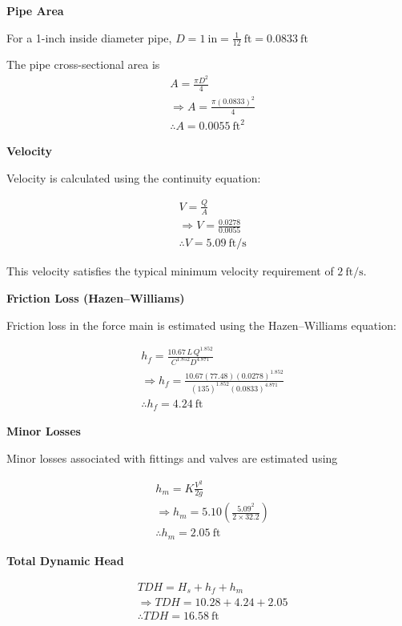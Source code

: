 \textbf{Pipe Area}

For a 1-inch inside diameter pipe,
$D = 1 \ \text{in} = \frac{1}{12} \ \text{ft} = 0.0833 \ \text{ft}$

The pipe cross-sectional area is
\[
  \begin{aligned}
    & A = \frac{\pi D^2}{4} \\
    &\Rightarrow A = \frac{\pi (0.0833)^2}{4}\\
    &\therefore A = 0.0055 \ \text{ft}^2
  \end{aligned}
\]


\textbf{Velocity}

Velocity is calculated using the continuity equation:

\[
  \begin{aligned}
    & V = \frac{Q}{A} \\
    &\Rightarrow V = \frac{0.0278}{0.0055} \\
    &\therefore V = 5.09 \ \text{ft/s}
  \end{aligned}
\]

This velocity satisfies the typical minimum velocity requirement of $2~\text{ft/s}$.

\textbf{Friction Loss (Hazen--Williams)}

Friction loss in the force main is estimated using the Hazen--Williams equation:

\[
  \begin{aligned}
    & h_f = \frac{10.67\,L\,Q^{1.852}}{C^{1.852}D^{4.871}} \\
    &\Rightarrow h_f =
    \frac{10.67(77.48)(0.0278)^{1.852}}
    {(135)^{1.852}(0.0833)^{4.871}} \\
    &\therefore h_f = 4.24 \ \text{ft}
  \end{aligned}
\]

\textbf{Minor Losses}

Minor losses associated with fittings and valves are estimated using

\[
  \begin{aligned}
    & h_m = K\frac{V^2}{2g} \\
    &\Rightarrow h_m =
    5.10\left(\frac{5.09^2}{2\times32.2}\right) \\
    &\therefore h_m = 2.05 \ \text{ft}
  \end{aligned}
\]

\textbf{Total Dynamic Head}

\[
  \begin{aligned}
    & TDH = H_s + h_f + h_m \\
    &\Rightarrow TDH = 10.28 + 4.24 + 2.05 \\
    &\therefore TDH = 16.58 \ \text{ft}
  \end{aligned}
\]


